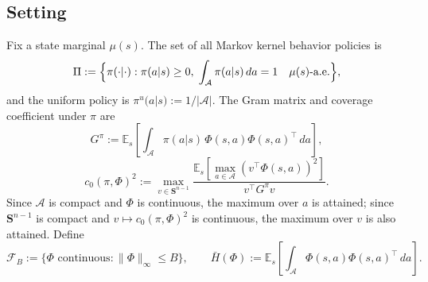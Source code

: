 \documentclass[12pt]{article}
\begin{document}
\subsection*{Setting}

Fix a state marginal $\mu(s)$.
The set of all Markov kernel behavior policies is
\begin{equation*}
\Pi := \Bigl\{\pi(\cdot|\cdot) : \pi(a|s) \geq 0,\;
\int_\mathcal{A}\pi(a|s)\,da = 1 \quad \mu(s)\text{-a.e.}\Bigr\},
\end{equation*}
and the uniform policy is $\pi^u(a|s) := 1/|\mathcal{A}|$.
The Gram matrix and coverage coefficient under $\pi$ are
\begin{equation*}
G^\pi := \mathbb{E}_s\!\left[\int_\mathcal{A}\pi(a|s)\,\Phi(s,a)\Phi(s,a)^\top\, da\right],
\end{equation*}
\begin{equation*}
c_0(\pi,\Phi)^2 := \max_{v \in \mathbf{S}^{n-1}}
\frac{\mathbb{E}_s\!\left[\max_{a\in\mathcal{A}}(v^\top\Phi(s,a))^2\right]}
     {v^\top G^\pi v}.
\end{equation*}
Since $\mathcal{A}$ is compact and $\Phi$ is continuous, the maximum over $a$
is attained; since $\mathbf{S}^{n-1}$ is compact and $v\mapsto c_0(\pi,\Phi)^2$
is continuous, the maximum over $v$ is also attained.
Define
\begin{equation*}
\mathcal{F}_B := \{\Phi \text{ continuous} : \|\Phi\|_\infty \leq B\},
\qquad
\bar{H}(\Phi) := \mathbb{E}_s\!\left[\int_\mathcal{A}\Phi(s,a)\Phi(s,a)^\top\, da\right].
\end{equation*}
\end{document}
